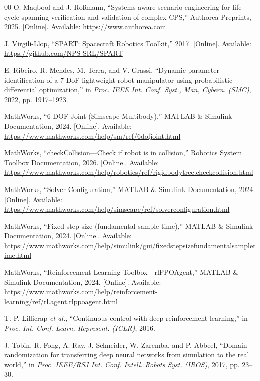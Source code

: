 \documentclass{ieeeaccess}
\begin{document}
\begin{thebibliography}{00}
O. Maqbool and J. Roßmann, ``Systems aware scenario engineering for life cycle-spanning verification and
validation of complex CPS,'' Authorea Preprints, 2025. [Online]. Available: \url{https://www.authorea.com}



 J. Virgili-Llop, ``SPART: Spacecraft Robotics Toolkit,'' 2017. [Online]. Available:
\url{https://github.com/NPS-SRL/SPART}



 E. Ribeiro, R. Mendes, M. Terra, and V. Grassi, ``Dynamic parameter identification of a
7-DoF lightweight robot manipulator using probabilistic differential optimization,'' in \emph{Proc. IEEE
Int. Conf. Syst., Man, Cybern. (SMC)}, 2022, pp. 1917--1923.



 MathWorks, ``6-DOF Joint (Simscape Multibody),'' MATLAB \& Simulink Documentation,
2024. [Online]. Available: \url{https://www.mathworks.com/help/sm/ref/6dofjoint.html}



 MathWorks, ``checkCollision---Check if robot is in collision,'' Robotics System
Toolbox Documentation, 2026. [Online]. Available:
\url{https://www.mathworks.com/help/robotics/ref/rigidbodytree.checkcollision.html}



 MathWorks, ``Solver Configuration,'' MATLAB \& Simulink Documentation, 2024. [Online].
Available: \url{https://www.mathworks.com/help/simscape/ref/solverconfiguration.html}



 MathWorks, ``Fixed-step size (fundamental sample time),'' MATLAB \& Simulink Documentation,
2024. [Online]. Available:
\url{https://www.mathworks.com/help/simulink/gui/fixedstepsizefundamentalsampletime.html}



 MathWorks, ``Reinforcement Learning Toolbox---rlPPOAgent,'' MATLAB \& Simulink
Documentation, 2024. [Online]. Available:
\url{https://www.mathworks.com/help/reinforcement-learning/ref/rl.agent.rlppoagent.html}



 T. P. Lillicrap \emph{et al.}, ``Continuous control with deep reinforcement learning,'' in
\emph{Proc. Int. Conf. Learn. Represent. (ICLR)}, 2016.



 J. Tobin, R. Fong, A. Ray, J. Schneider, W. Zaremba, and P. Abbeel, ``Domain randomization
for transferring deep neural networks from simulation to the real world,'' in \emph{Proc. IEEE/RSJ Int.
Conf. Intell. Robots Syst. (IROS)}, 2017, pp. 23--30.


\end{thebibliography}
\end{document}
